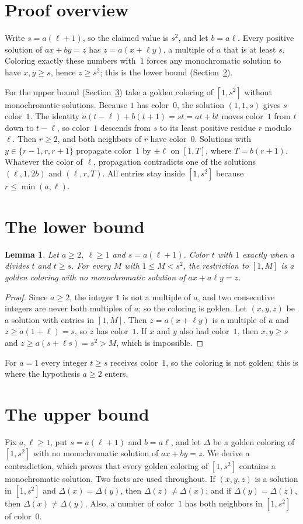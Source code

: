 \documentclass[11pt]{article}
\newtheorem{lemma}[theorem]{Lemma}
\theoremstyle{remark}
\begin{document}
\section{Proof overview}
Write $s=a(\ell+1)$, so the claimed value is $s^2$, and let
$b=a\ell$. Every positive solution of $ax+by=z$ has $z=a(x+\ell y)$,
a multiple of $a$ that is at least $s$. Coloring exactly these numbers
with~$1$ forces any monochromatic solution to have $x,y\ge s$, hence
$z\ge s^2$; this is the lower bound (Section~\ref{sec:lower}).

For the upper bound (Section~\ref{sec:upper}) take a golden coloring of
$[1,s^2]$ without monochromatic solutions. Because $1$ has color~$0$, the
solution $(1,1,s)$ gives $s$ color~$1$. The identity
$a(t-\ell)+b(t+1)=st=at+bt$ moves color~$1$ from $t$ down to $t-\ell$,
so color~$1$ descends from $s$ to its least positive residue $r$
modulo $\ell$. Then $r\ge2$, and both neighbors of $r$ have color~$0$.
Solutions with $y\in\{r-1,r,r+1\}$ propagate color~$1$ by $\pm\ell$
on $[1,T]$, where $T=b(r+1)$. Whatever the color of $\ell$, propagation
contradicts one of the solutions $(\ell,1,2b)$ and $(\ell,r,T)$. All
entries stay inside $[1,s^2]$ because $r\le\min(a,\ell)$.

\section{The lower bound}\label{sec:lower}
\begin{lemma}\label{lem:lower}
Let $a\ge2$, $\ell\ge1$ and $s=a(\ell+1)$. Color $t$ with $1$ exactly
when $a$ divides $t$ and $t\ge s$. For every $M$ with $1\le M<s^2$, the
restriction to $[1,M]$ is a golden coloring with no monochromatic
solution of $ax+a\ell y=z$.
\end{lemma}
\begin{proof}
Since $a\ge2$, the integer $1$ is not a multiple of $a$, and two
consecutive integers are never both multiples of $a$; so the coloring
is golden. Let $(x,y,z)$ be a solution with entries in $[1,M]$. Then
$z=a(x+\ell y)$ is a multiple of $a$ and $z\ge a(1+\ell)=s$, so $z$ has
color~$1$. If $x$ and $y$ also had color~$1$, then $x,y\ge s$ and
$z\ge a(s+\ell s)=s^2>M$, which is impossible.
\end{proof}

For $a=1$ every integer $t\ge s$ receives color~$1$, so the coloring is
not golden; this is where the hypothesis $a\ge2$ enters.

\section{The upper bound}\label{sec:upper}
Fix $a,\ell\ge1$, put $s=a(\ell+1)$ and $b=a\ell$, and let $\Delta$ be a
golden coloring of $[1,s^2]$ with no monochromatic solution of
$ax+by=z$. We derive a contradiction, which proves that every golden
coloring of $[1,s^2]$ contains a monochromatic solution. Two facts are
used throughout. If $(x,y,z)$ is a solution in $[1,s^2]$ and
$\Delta(x)=\Delta(y)$, then $\Delta(z)\ne\Delta(x)$; and if
$\Delta(y)=\Delta(z)$, then $\Delta(x)\ne\Delta(y)$. Also, a number of
color~$1$ has both neighbors in $[1,s^2]$ of color~$0$.
\end{document}
